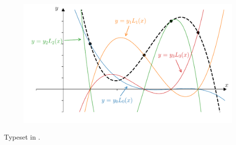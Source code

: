 \begin{titlepage}
\begin{figure}[H]
\includegraphics[width=\textwidth]{figures/ch3_lagrange_total.pdf}
\end{figure}

\vfill %

\begin{center}
Typeset in \LaTeXe.
\end{center}
\end{titlepage}
